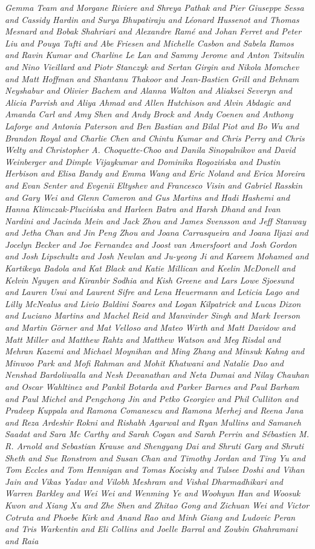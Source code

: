\documentclass[licencjacka,en]{pracamgr}
\begin{document}
\begin{thebibliography}{99}
\textit{
Gemma Team and Morgane Riviere and Shreya Pathak and Pier Giuseppe Sessa and Cassidy Hardin and Surya Bhupatiraju and Léonard Hussenot and Thomas Mesnard and Bobak Shahriari and Alexandre Ramé and Johan Ferret and Peter Liu and Pouya Tafti and Abe Friesen and Michelle Casbon and Sabela Ramos and Ravin Kumar and Charline Le Lan and Sammy Jerome and Anton Tsitsulin and Nino Vieillard and Piotr Stanczyk and Sertan Girgin and Nikola Momchev and Matt Hoffman and Shantanu Thakoor and Jean-Bastien Grill and Behnam Neyshabur and Olivier Bachem and Alanna Walton and Aliaksei Severyn and Alicia Parrish and Aliya Ahmad and Allen Hutchison and Alvin Abdagic and Amanda Carl and Amy Shen and Andy Brock and Andy Coenen and Anthony Laforge and Antonia Paterson and Ben Bastian and Bilal Piot and Bo Wu and Brandon Royal and Charlie Chen and Chintu Kumar and Chris Perry and Chris Welty and Christopher A. Choquette-Choo and Danila Sinopalnikov and David Weinberger and Dimple Vijaykumar and Dominika Rogozińska and Dustin Herbison and Elisa Bandy and Emma Wang and Eric Noland and Erica Moreira and Evan Senter and Evgenii Eltyshev and Francesco Visin and Gabriel Rasskin and Gary Wei and Glenn Cameron and Gus Martins and Hadi Hashemi and Hanna Klimczak-Plucińska and Harleen Batra and Harsh Dhand and Ivan Nardini and Jacinda Mein and Jack Zhou and James Svensson and Jeff Stanway and Jetha Chan and Jin Peng Zhou and Joana Carrasqueira and Joana Iljazi and Jocelyn Becker and Joe Fernandez and Joost van Amersfoort and Josh Gordon and Josh Lipschultz and Josh Newlan and Ju-yeong Ji and Kareem Mohamed and Kartikeya Badola and Kat Black and Katie Millican and Keelin McDonell and Kelvin Nguyen and Kiranbir Sodhia and Kish Greene and Lars Lowe Sjoesund and Lauren Usui and Laurent Sifre and Lena Heuermann and Leticia Lago and Lilly McNealus and Livio Baldini Soares and Logan Kilpatrick and Lucas Dixon and Luciano Martins and Machel Reid and Manvinder Singh and Mark Iverson and Martin Görner and Mat Velloso and Mateo Wirth and Matt Davidow and Matt Miller and Matthew Rahtz and Matthew Watson and Meg Risdal and Mehran Kazemi and Michael Moynihan and Ming Zhang and Minsuk Kahng and Minwoo Park and Mofi Rahman and Mohit Khatwani and Natalie Dao and Nenshad Bardoliwalla and Nesh Devanathan and Neta Dumai and Nilay Chauhan and Oscar Wahltinez and Pankil Botarda and Parker Barnes and Paul Barham and Paul Michel and Pengchong Jin and Petko Georgiev and Phil Culliton and Pradeep Kuppala and Ramona Comanescu and Ramona Merhej and Reena Jana and Reza Ardeshir Rokni and Rishabh Agarwal and Ryan Mullins and Samaneh Saadat and Sara Mc Carthy and Sarah Cogan and Sarah Perrin and Sébastien M. R. Arnold and Sebastian Krause and Shengyang Dai and Shruti Garg and Shruti Sheth and Sue Ronstrom and Susan Chan and Timothy Jordan and Ting Yu and Tom Eccles and Tom Hennigan and Tomas Kocisky and Tulsee Doshi and Vihan Jain and Vikas Yadav and Vilobh Meshram and Vishal Dharmadhikari and Warren Barkley and Wei Wei and Wenming Ye and Woohyun Han and Woosuk Kwon and Xiang Xu and Zhe Shen and Zhitao Gong and Zichuan Wei and Victor Cotruta and Phoebe Kirk and Anand Rao and Minh Giang and Ludovic Peran and Tris Warkentin and Eli Collins and Joelle Barral and Zoubin Ghahramani and Raia }
\end{thebibliography}
\end{document}
